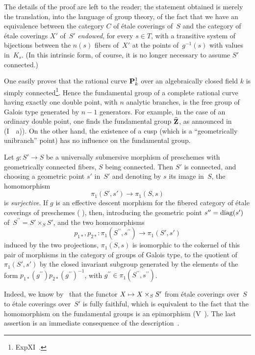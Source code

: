 The
details of the proof are left to the reader; the statement obtained
is merely the translation, into the language of group theory, of the
fact that we have an equivalence between the category $C$ of étale
coverings of~$S$ and the category of étale coverings $X'$ of~$S'$
\emph{endowed}, for every $s\in T$, with a transitive system of
bijections between the $n(s)$ fibers of~$X'$ at the points
of~$g^{-1}(s)$ with values in~$K_s$. (In this intrinsic form, of
course, it is no longer necessary to assume $S'$ connected.)
\begin{example}
\label{IX.5.5}
One easily proves that the rational curve $\mathbf{P}^1_k$ over an
algebraically closed field $k$ is simply
connected\footnote{\Cf Exp\ptbl XI~.}. Hence the
fundamental group of a complete rational curve having exactly one
double point, with $n$ analytic branches, is the free group of Galois
type generated by $n-1$ generators. For example, in the case of an
ordinary double point, one finds the fundamental group $\widehat{\mathbf{Z}}$, as
announced in (I~~a)). On the other hand, the existence of a
cusp (which is a ``geometrically unibranch'' point) has no influence
on the fundamental group.
\end{example}

\begin{corollary}
\label{IX.5.6}
Let $g\colon S'\to S$ be a universally submersive morphism of
preschemes with geometrically connected fibers, $S$ being connected.
Then $S'$ is connected, and choosing a geometric point $s'$ in~$S'$
and denoting by $s$ its image in~$S$, the homomorphism
$$
\pi_1(S',s')\to \pi_1(S,s)
$$
is \emph{surjective}. If $g$ is an effective descent morphism for the
fibered category of étale coverings of preschemes (\cf
\emph{}), then, introducing the geometric point
$s^{\prime\prime}=\operatorname{diag}(s')$ of~$S^{\prime\prime}=S'\times_S S'$, and
the two homomorphisms
$$
p_{1*},p_{2*}\colon \pi_1(S^{\prime\prime},s^{\prime\prime}) \to
\pi_1(S',s')
$$
induced by the two projections, $\pi_1(S, s)$ is isomorphic to the
cokernel of this pair of morphisms in the category of groups of Galois
type, \ie to the quotient of~$\pi_1(S',s')$ by the closed invariant
subgroup generated by the
elements of the form
$p_{1*}(g^{\prime\prime})p_{2*}(g^{\prime\prime})^{-1}$, with
$g^{\prime\prime}\in \pi_1(S^{\prime\prime},s^{\prime\prime})$.
\end{corollary}

Indeed, we know by~ that the functor $X\mto X\times_SS'$
from étale coverings over~$S$ to étale coverings over~$S'$ is fully
faithful, which is equivalent to the fact that the homomorphism on
the fundamental groups is an epimorphism (V~). The last
assertion is an immediate consequence of the
description~.

